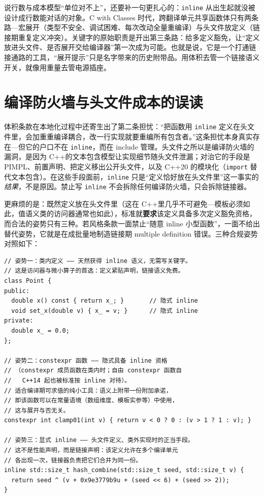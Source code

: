 \documentclass[12pt,a4paper,fontset=fandol]{ctexbook}
\newcommand{\cpp}[1]{C++#1}
\newcommand{\Tp}[1]{\texttt{#1}}
\newcommand{\Lang}[1]{\textsf{#1}}
\newcommand{\CPP}{\Lang{C++}}
\begin{document}
\begin{note}[title={关键字的出生证明}]
说行数与成本模型``单位对不上''，还要补一句更扎心的：\Tp{inline} 从出生起就没被设计成行数能对话的对象。C with Classes 时代，跨翻译单元共享函数体只有两条路---宏展开（类型不安全、调试困难、每次改动全量重编译）与头文件放定义（链接期重复定义冲突）。关键字的原始职责是开出第三条路：给多定义豁免，让``定义放进头文件、是否展开交给编译器''第一次成为可能。也就是说，它是一个打通链接通路的工具，``展开提示''只是名字带来的历史附带品。用体积去管一个链接语义开关，就像用重量去管电源插座。
\end{note}

\section{编译防火墙与头文件成本的误读}
\label{sec:ch09-header}

体积条款在本地化过程中还寄生出了第二条担忧：``把函数用 \Tp{inline} 定义在头文件里，会加重重编译耦合，改一行实现就要重编所有包含者。''这条担忧本身真实存在---但它的户口不在 \Tp{inline}，而在 include 管理。头文件之所以是编译防火墙的漏洞，是因为 \CPP 的文本包含模型让实现细节随头文件泄漏；对治它的手段是 PIMPL、前置声明、把定义移出公开头文件，以及 \cpp{20} 的模块化（\Tp{import} 替代文本包含）。在这些手段面前，\Tp{inline} 只是``定义恰好放在头文件里''这一事实的\textit{结果}，不是原因。禁止写 \Tp{inline} 不会拆除任何编译防火墙，只会拆除链接器。

更麻烦的是：既然定义放在头文件里（这在 \CPP 里几乎不可避免---模板必须如此，值语义类的访问器通常也如此），标准就\textbf{要求}该定义具备多次定义豁免资格，而合法的姿势只有三种。若风格条款一面禁止``随意 inline 小型函数''，一面不给出替代姿势，它就是在成批量地制造链接期 multiple definition 错误。三种合规姿势对照如下：

\begin{lstlisting}[style=cppstyle]
// 姿势一：类内定义 —— 天然获得 inline 语义，无需写关键字。
// 这是访问器与微小算子的首选：定义紧贴声明，链接语义免费。
class Point {
public:
  double x() const { return x_; }       // 隐式 inline
  void set_x(double v) { x_ = v; }      // 隐式 inline
private:
  double x_ = 0.0;
};

// 姿势二：constexpr 函数 —— 隐式具备 inline 资格
// （constexpr 成员函数在类内时；自由 constexpr 函数自
//   C++14 起也被标准按 inline 对待）。
// 适合编译期可求值的纯小工具：语义上附带一份附加承诺，
// 即该函数可以在常量语境（数组维度、模板实参等）中使用，
// 这与展开与否无关。
constexpr int clamp01(int v) { return v < 0 ? 0 : (v > 1 ? 1 : v); }

// 姿势三：显式 inline —— 头文件定义、类外实现时的正当手段。
// 这不是性能声明，而是链接声明：该定义允许在多个编译单元
// 各出现一次，链接器负责把它们合并为同一份。
inline std::size_t hash_combine(std::size_t seed, std::size_t v) {
  return seed ^ (v + 0x9e3779b9u + (seed << 6) + (seed >> 2));
}
\end{lstlisting}
\end{document}
